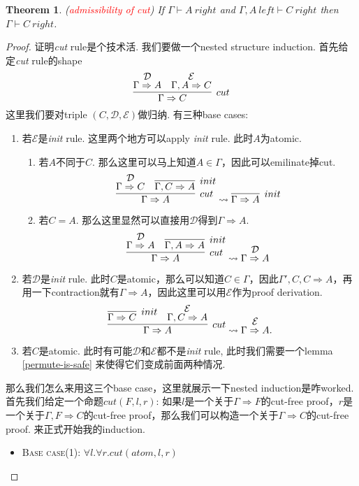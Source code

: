 \documentclass{article}
\theoremstyle{plain}
\newtheorem{theorem}{Theorem}
\theoremstyle{nonumberplain}
\newtheorem{proof}{Proof}
\newcommand{\redt}[1]{\textcolor{red}{#1}}
\begin{document}
\begin{theorem}
\rm (\redt{admissibility of cut}) If $\Gamma \vdash A~right$ and $\Gamma, A~left \vdash C~right$ then $\Gamma \vdash C~right$.
\end{theorem}

\begin{proof}
\rm 证明\emph{cut} rule是个技术活. 我们要做一个nested structure induction. 首先给定\emph{cut} rule的shape
$$
\infer[cut]{\Gamma \Rightarrow C}{\deduce{\Gamma \Rightarrow A}{\mathcal{D}} & \deduce{\Gamma,A \Rightarrow C}{\mathcal{E}}}
$$
这里我们要对triple $(C,\mathcal{D}, \mathcal{E})$做归纳. 有三种base cases:
\begin{enumerate}
	\item 若$\mathcal{E}$是\emph{init} rule. 这里两个地方可以apply \emph{init} rule. 此时$A$为atomic.
	\begin{enumerate}
		\item 若$A$不同于$C$. 那么这里可以马上知道$A \in \Gamma$，因此可以emilinate掉cut. 
		$$
			\infer[cut]{\Gamma \Rightarrow A}{\deduce{\Gamma \Rightarrow C}{\mathcal{D}} & \infer[init]{\Gamma,C \Rightarrow A}{}} \leadsto \infer[init]{\Gamma \Rightarrow A}{}
		$$
		\item 若$C=A$. 那么这里显然可以直接用$\mathcal{D}$得到$\Gamma \Rightarrow A$. 
		$$
			\infer[cut]{\Gamma \Rightarrow A}{\deduce{\Gamma \Rightarrow A}{\mathcal{D}} & \infer[init]{\Gamma,A \Rightarrow A}{}} \leadsto \deduce{\Gamma \Rightarrow A}{\mathcal{D}}
		$$
	\end{enumerate}
	\item 若$\mathcal{D}$是\emph{init} rule. 此时$C$是atomic，那么可以知道$C \in \Gamma$，因此$\Gamma', C ,C \Rightarrow A$，再用一下contraction就有$\Gamma \Rightarrow A$，因此这里可以用$\mathcal{E}$作为proof derivation.
	$$
		\infer[cut]{\Gamma \Rightarrow A}{\infer[init]{\Gamma \Rightarrow C}{} & \deduce{\Gamma, C \Rightarrow A}{\mathcal{E}}} \leadsto \deduce{\Gamma \Rightarrow A}{\mathcal{E}}.
	$$
	\item 若$C$是atomic. 此时有可能$\mathcal{D}$和$\mathcal{E}$都不是\emph{init} rule, 此时我们需要一个lemma \ref{permute-is-safe} 来使得它们变成前面两种情况. 
\end{enumerate}
那么我们怎么来用这三个base case，这里就展示一下nested induction是咋worked. 首先我们给定一个命题$cut(F,l,r)$: 如果$l$是一个关于$\Gamma \Rightarrow F$的cut-free proof，$r$是一个关于$\Gamma, F \Rightarrow C$的cut-free proof，那么我们可以构造一个关于$\Gamma \Rightarrow C$的cut-free proof. 来正式开始我的induction.
\begin{itemize}
	\item \cite{15-317-caie}\textsc{Base case}(1): $\forall l. \forall r.cut(atom,l,r)$
	

\end{itemize}
\end{proof}
\end{document}
